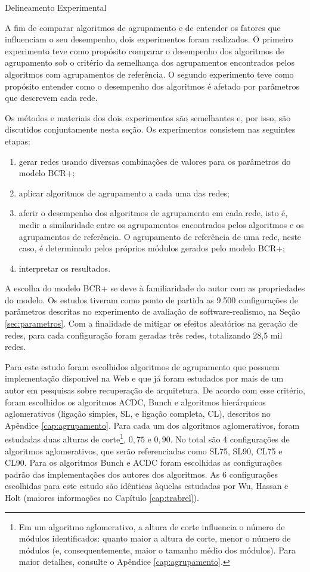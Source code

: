 \begin{section}{Delineamento Experimental}
	
	A fim de comparar algoritmos de agrupamento e de entender os fatores que influenciam o seu desempenho, dois experimentos foram realizados. O primeiro experimento teve como propósito comparar o desempenho dos algoritmos de agrupamento sob o critério da semelhança dos agrupamentos encontrados pelos algoritmos com agrupamentos de referência. O segundo experimento teve como propósito entender como o desempenho dos algoritmos é afetado por parâmetros que descrevem cada rede.
	
	Os métodos e materiais dos dois experimentos são semelhantes e, por isso, são discutidos conjuntamente nesta seção. Os experimentos consistem nas seguintes etapas: 
\begin{enumerate}
	\item gerar redes usando diversas combinações de valores para os parâmetros do modelo BCR+;
	\item aplicar algoritmos de agrupamento a cada uma das redes;
	\item aferir o desempenho dos algoritmos de agrupamento em cada rede, isto é, medir a similaridade entre os agrupamentos encontrados pelos algoritmos e os agrupamentos de referência. O agrupamento de referência de uma rede, neste caso, é determinado pelos próprios módulos gerados pelo modelo BCR+;
	\item interpretar os resultados.
\end{enumerate}

	A escolha do modelo BCR+ se deve à familiaridade do autor com as propriedades do modelo. Os estudos tiveram como ponto de partida as 9.500 configurações de parâmetros descritas no experimento de avaliação de software-realismo, na Seção \ref{sec:parametros}. Com a finalidade de mitigar os efeitos aleatórios na geração de redes, para cada configuração foram geradas três redes, totalizando 28,5 mil redes.

	Para este estudo foram escolhidos algoritmos de agrupamento que possuem implementação disponível na Web e que já foram estudados por mais de um autor em pesquisas sobre recuperação de arquitetura. De acordo com esse critério, foram escolhidos os algoritmos ACDC, Bunch e algoritmos hierárquicos aglomerativos (ligação simples, SL, e ligação completa, CL), descritos no Apêndice \ref{cap:agrupamento}. Para cada um dos algoritmos aglomerativos, foram estudadas duas alturas de corte\footnote{Em um algoritmo aglomerativo, a altura de corte influencia o número de módulos identificados: quanto maior a altura de corte, menor o número de módulos (e, consequentemente, maior o tamanho médio dos módulos). Para maior detalhes, consulte o Apêndice \ref{cap:agrupamento}.}, $0,75$ e $0,90$. No total são 4 configurações de algoritmos aglomerativos, que serão referenciadas como SL75, SL90, CL75 e CL90. Para os algoritmos Bunch e ACDC foram escolhidas as configurações padrão das implementações dos autores dos algoritmos. As 6 configurações escolhidas para este estudo são idênticas àquelas estudadas por Wu, Hassan e Holt \cite{Wu2005} (maiores informações no Capítulo \ref{cap:trabrel}).
	

\end{section}
